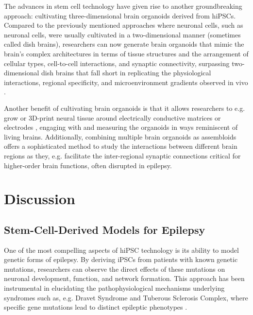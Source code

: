 \documentclass[10pt]{article}
\begin{document}
\begin{sloppypar}
  The advances in stem cell technology have given rise to another groundbreaking approach: cultivating three-dimensional brain organoids derived from hiPSCs. Compared to the previously mentioned approaches where neuronal cells, such as neuronal cells, were usually cultivated in a two-dimensional manner (sometimes called dish brains), researchers can now generate brain organoids that mimic the brain’s complex architectures in terms of tissue structures and the arrangement of cellular types, cell-to-cell interactions, and synaptic connectivity, surpassing two-dimensional dish brains that fall short in replicating the physiological interactions, regional specificity, and microenvironment gradients observed in vivo \citep{clevers_modeling_2016, wang_modeling_2018}.

  Another benefit of cultivating brain organoids is that it allows researchers to e.g. grow or 3D-print neural tissue around electrically conductive matrices or electrodes \citep{yao_3d_2023}, engaging with and measuring the organoids in ways reminiscent of living brains. Additionally, combining multiple brain organoids as assembloids offers a sophisticated method to study the interactions between different brain regions \citep{sloan_generation_2018} as they, e.g. facilitate the inter-regional synaptic connections critical for higher-order brain functions, often disrupted in epilepsy.

  \section{Discussion}
  \label{sec:discussion}


  \subsection{Stem-Cell-Derived Models for Epilepsy}
  \label{sec:stem-cell-derived-models-for-epilepsy}

  One of the most compelling aspects of hiPSC technology is its ability to model genetic forms of epilepsy. By deriving iPSCs from patients with known genetic mutations, researchers can observe the direct effects of these mutations on neuronal development, function, and network formation. This approach has been instrumental in elucidating the pathophysiological mechanisms underlying syndromes such as, e.g. Dravet Syndrome and Tuberous Sclerosis Complex, where specific gene mutations lead to distinct epileptic phenotypes \citep{jiao_modeling_2013, nadadhur_neuron-glia_2019}.


\end{sloppypar}
\end{document}
